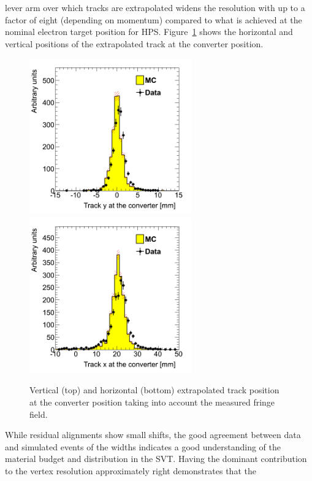 \documentclass[final,3p,times,twocolumn]{elsarticle}
\begin{document}
lever arm over which tracks are extrapolated widens the resolution with up to a factor of eight 
(depending on momentum) compared to what is achieved at the nominal electron target position for 
HPS. Figure~\ref{fig:impact_param} shows the horizontal and vertical positions of the extrapolated track 
at the converter position. 
{\small
	 \begin{figure}[]
 \begin{center}
	\includegraphics[width=7cm]{figures/h_trk_top_fr_conv_z_h_trk_top_conv_z_dataMC_twotrksel.png}
	\includegraphics[width=7cm]{figures/h_trk_top_fr_conv_y_h_trk_top_conv_y_dataMC_twotrksel.png}
	\caption{ Vertical (top) and horizontal (bottom) extrapolated track position at the converter position 
	taking into account the measured fringe field. }
	\label{fig:impact_param}
\end{center}
\end{figure}
}
While residual alignments show small shifts, the good agreement  between data and simulated 
events of the widths indicates a good understanding of the material budget and distribution in the SVT.  
Having  the dominant contribution to the vertex resolution approximately right demonstrates that the 
\end{document}
